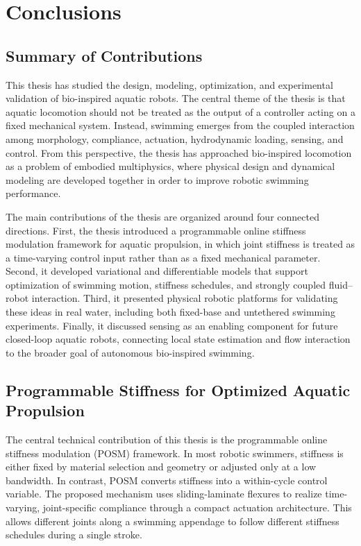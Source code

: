 
\chapter{Conclusions} \label{chapConclusions}

\section{Summary of Contributions}

This thesis has studied the design, modeling, optimization, and experimental validation of bio-inspired aquatic robots. The central theme of the thesis is that aquatic locomotion should not be treated as the output of a controller acting on a fixed mechanical system. Instead, swimming emerges from the coupled interaction among morphology, compliance, actuation, hydrodynamic loading, sensing, and control. From this perspective, the thesis has approached bio-inspired locomotion as a problem of embodied multiphysics, where physical design and dynamical modeling are developed together in order to improve robotic swimming performance.

The main contributions of the thesis are organized around four connected directions. First, the thesis introduced a programmable online stiffness modulation framework for aquatic propulsion, in which joint stiffness is treated as a time-varying control input rather than as a fixed mechanical parameter. Second, it developed variational and differentiable models that support optimization of swimming motion, stiffness schedules, and strongly coupled fluid--robot interaction. Third, it presented physical robotic platforms for validating these ideas in real water, including both fixed-base and untethered swimming experiments. Finally, it discussed sensing as an enabling component for future closed-loop aquatic robots, connecting local state estimation and flow interaction to the broader goal of autonomous bio-inspired swimming.

\section{Programmable Stiffness for Optimized Aquatic Propulsion}

The central technical contribution of this thesis is the programmable online stiffness modulation (POSM) framework. In most robotic swimmers, stiffness is either fixed by material selection and geometry or adjusted only at a low bandwidth. In contrast, POSM converts stiffness into a within-cycle control variable. The proposed mechanism uses sliding-laminate flexures to realize time-varying, joint-specific compliance through a compact actuation architecture. This allows different joints along a swimming appendage to follow different stiffness schedules during a single stroke.

